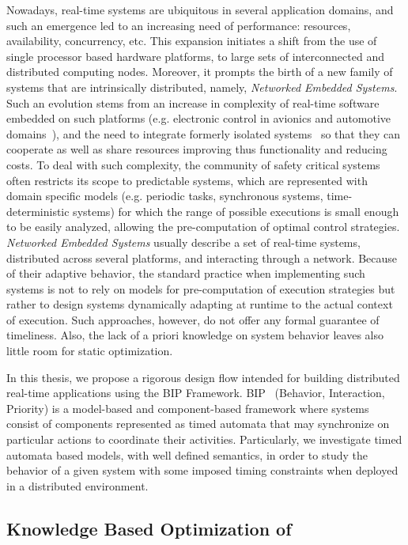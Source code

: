 Nowadays, real-time systems are ubiquitous in several application domains, 
and such an emergence led to an increasing need of performance: resources, 
availability, concurrency, etc. This expansion initiates a shift from the
use of single processor based hardware platforms, to large sets 
of interconnected and distributed computing nodes. Moreover, it prompts the birth 
of a new family of systems that are intrinsically distributed, namely, 
\emph{Networked Embedded Systems}. 
Such an evolution stems from an increase in complexity of real-time software 
embedded on such platforms (e.g. electronic control in avionics 
and automotive domains~\cite{charette09}), and the need to integrate 
formerly isolated systems~\cite{kopetz04} so that 
they can cooperate as well as share resources improving thus functionality 
and reducing costs.
To deal with such complexity, the community of safety critical systems 
often restricts its scope to predictable systems, which are represented 
with domain specific models (e.g. periodic tasks, synchronous systems, 
time-deterministic systems) for which the range of possible executions 
is small enough to be easily analyzed, allowing the pre-computation 
of optimal control strategies.
\emph{Networked Embedded Systems} usually describe a set of real-time systems, 
distributed across several platforms, and interacting through a network. 
Because of their adaptive behavior, the standard practice when implementing 
such systems is not to rely on models for pre-computation of execution strategies but rather 
to design systems dynamically adapting at runtime to the actual context of execution.
Such approaches, however, do not offer any formal guarantee of timeliness. Also, 
the lack of a priori knowledge on system behavior leaves also little room for 
static optimization.

In this thesis, we propose a rigorous design flow intended for building distributed real-time 
applications using the BIP Framework. BIP~\cite{intro:bip} (Behavior, Interaction, Priority)
is a model-based and component-based framework where systems consist of components
represented as timed automata that may synchronize on particular actions to coordinate
their activities.
Particularly, we investigate timed automata based models, with well defined semantics, in order 
to study the behavior of a given system with some imposed timing constraints when deployed 
in a distributed environment. 

\subsection*{Knowledge Based Optimization of}

